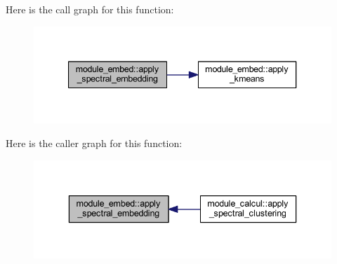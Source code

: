 Here is the call graph for this function\+:\nopagebreak
\begin{figure}[H]
\begin{center}
\leavevmode
\includegraphics[width=340pt]{namespacemodule__embed_ab78350f96b04d0ce2ca0bd10abd50440_cgraph}
\end{center}
\end{figure}




Here is the caller graph for this function\+:\nopagebreak
\begin{figure}[H]
\begin{center}
\leavevmode
\includegraphics[width=336pt]{namespacemodule__embed_ab78350f96b04d0ce2ca0bd10abd50440_icgraph}
\end{center}
\end{figure}


